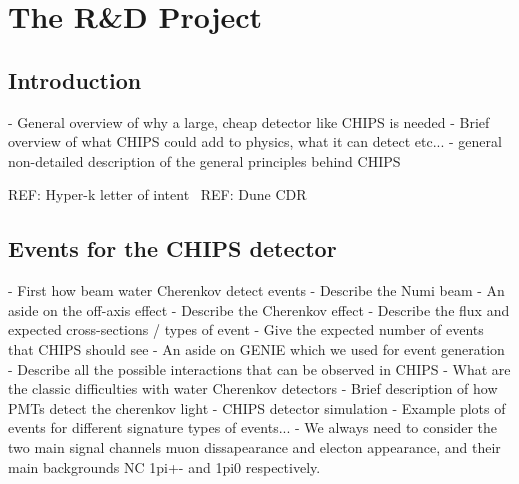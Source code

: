 \chapter{The \chips R\&D Project}
\label{chap:chips}

\section{Introduction}
\label{sec:chips_intro}
- General overview of why a large, cheap detector like CHIPS is needed
- Brief overview of what CHIPS could add to physics, what it can detect etc...
- general non-detailed description of the general principles behind CHIPS

REF: Hyper-k letter of intent~\cite{abe2011}
REF: Dune CDR~\cite{acciarri2016}

\section{Events for the CHIPS detector}
\label{sec:chips_events}
- First how beam water Cherenkov detect events
- Describe the Numi beam
- An aside on the off-axis effect
- Describe the Cherenkov effect
- Describe the flux and expected cross-sections / types of event
- Give the expected number of events that CHIPS should see
- An aside on GENIE which we used for event generation
- Describe all the possible interactions that can be observed in CHIPS
- What are the classic difficulties with water Cherenkov detectors
- Brief description of how PMTs detect the cherenkov light
- CHIPS detector simulation
- Example plots of events for different signature types of events...
- We always need to consider the two main signal channels muon dissapearance and electon appearance, and their main backgrounds
NC 1pi+- and 1pi0 respectively.

